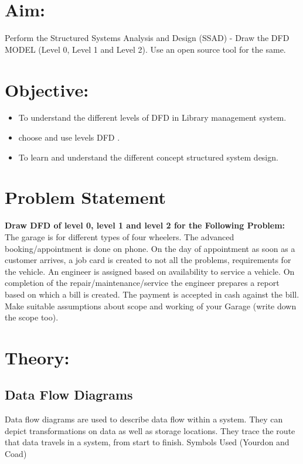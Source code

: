 \documentclass[16pt]{article}
\begin{document}
\clearpage

\tableofcontents

\clearpage
\section{\textbf{Aim:}}     
Perform the Structured Systems Analysis and Design (SSAD) - Draw the DFD MODEL (Level
0, Level 1 and Level 2). Use an open source tool for the same.
\section{\textbf{Objective:}}
\begin{itemize}
    \item To understand the different levels of DFD in Library management system.
    \item choose and use levels DFD .
    \item To learn and understand the different concept structured system design. 
\end{itemize}

\section{\textbf{Problem Statement}}
\textbf{Draw DFD of level 0, level 1 and level 2 for the Following Problem:}
The garage is for different types of four wheelers. The advanced booking/appointment is
done on phone. On the day of appointment as soon as a customer arrives, a job card is created to
not all the problems, requirements for the vehicle. An engineer is assigned based on availability
to service a vehicle. On completion of the repair/maintenance/service the engineer prepares a
report based on which a bill is created. The payment is accepted in cash against the bill. Make
suitable assumptions about scope and working of your Garage (write down the scope too).

\section{\textbf{Theory:}}
\subsection{\textbf{Data Flow Diagrams}}
Data flow diagrams are used to describe data flow within a system. They can depict transformations on
data as well as storage locations. They trace the route that data travels in a system, from start to finish.
Symbols Used (Yourdon and Coad)
\end{document}
